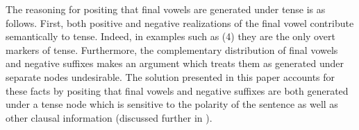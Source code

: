 \documentclass[output=paper]{langsci/langscibook}
\begin{document}
% 
% 
% 



 





The reasoning for positing that final vowels are generated under tense is as follows. First, both positive and negative realizations of the final vowel contribute semantically to tense. Indeed, in examples such as (4) they are the only overt markers of tense. Furthermore, the complementary distribution of final vowels and negative suffixes makes an argument which treats them as generated under separate nodes undesirable. The solution presented in this paper accounts for these facts by positing that final vowels and negative suffixes are both generated under a tense node which is sensitive to the polarity of the sentence as well as other clausal information (discussed further in ).

\end{document}
